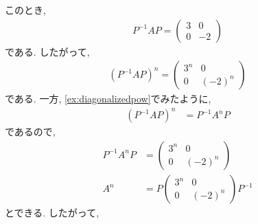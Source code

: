 このとき,
\begin{align*}
  P^{-1}AP=
  \begin{pmatrix}
    3&0\\
    0&-2
  \end{pmatrix}
\end{align*}
である.
したがって,
\begin{align*}
  (P^{-1}AP)^n=
  \begin{pmatrix}
    3^n&0\\
    0&(-2)^n
  \end{pmatrix}
\end{align*}
である. 一方, \cref{ex:diagonalizedpow}でみたように,
\begin{align*}
  (P^{-1}AP)^n
  &=P^{-1}A^nP
\end{align*}
であるので,
\begin{align*}
P^{-1}A^nP&=
  \begin{pmatrix}
    3^n&0\\
    0&(-2)^n
  \end{pmatrix}
\\
A^n&=
P
  \begin{pmatrix}
    3^n&0\\
    0&(-2)^n
  \end{pmatrix}
  P^{-1}
\end{align*}
とできる.
したがって,
